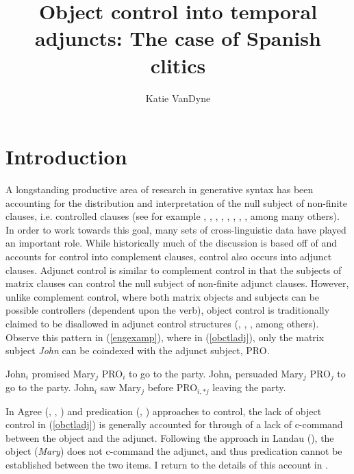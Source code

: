 \documentclass[output=paper,colorlinks,citecolor=brown]{langscibook}
\author{Katie VanDyne\affiliation{University of Illinois at Urbana-Champaign}}
\title{Object control into temporal adjuncts: The case of Spanish clitics}
\begin{document}
\maketitle

\section{Introduction} \label{Section1}
A longstanding productive area of research in generative syntax has been accounting for the distribution and interpretation of the null subject of non-finite clauses, i.e. controlled clauses (see for example \citealt{williams1992}, \citealt{hornstein1999}, \citeyear{hornstein2000}, \citealt{boeckx2010}, \citealt{gallego2011}, \citealt{landau2001elements}, \citeyear{landau2013}, \citeyear{landau2015}, among many others). In order to work towards this goal, many sets of cross-linguistic data have played an important role. While historically much of the discussion is based off of and accounts for control into complement clauses, control also occurs into adjunct clauses. Adjunct control is similar to complement control in that the subjects of matrix clauses can control the null subject of non-finite adjunct clauses. However, unlike complement control, where both matrix objects and subjects can be possible controllers (dependent upon the verb), object control is traditionally claimed to be disallowed in adjunct control structures (\citealt{landau2013}, \citeyear{landau2015}, \citealt{boeckx2010}, among others). Observe this pattern in (\ref{engexamp}), where in (\ref{obctladj}), only the matrix subject \textit{John} can be coindexed with the adjunct subject, PRO.

\ea \label{engexamp}
\ea \label{subctl}  John$_{i}$ promised Mary$_{j}$ PRO$_{i}$ to go to the party.
\ex  \label{obctl} John$_{i}$ persuaded Mary$_{j}$ PRO$_{j}$ to go to the party.
\ex \label{obctladj} John$_{i}$ saw Mary$_{j}$ before PRO$_{i, *j}$ leaving the party.
\z
\z

In Agree (\citealt{williams1992}, \citealt{landau2001elements}, \citealt{gallego2011}) and predication (\citealt{landau2015}, \citeyear{landau2017}) approaches to control, the lack of object control in (\ref{obctladj}) is generally accounted for through of a lack of c-command between the object and the adjunct. Following the approach in Landau (\citeyear{landau2015}), the object (\textit{Mary}) does not c-command the adjunct, and thus predication cannot be established between the two items. I return to the details of this account in .
\end{document}
